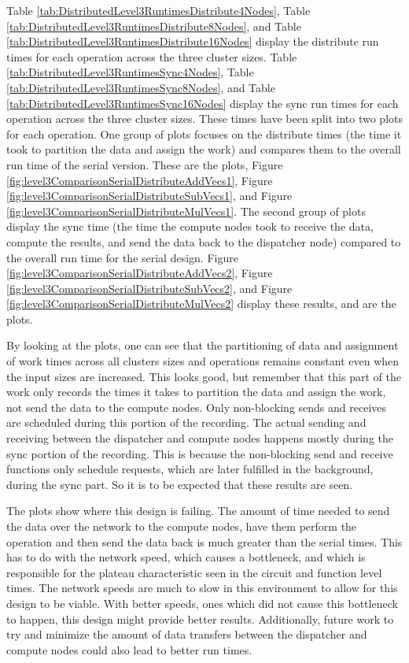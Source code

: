 Table \ref{tab:DistributedLevel3RuntimesDistribute4Nodes}, Table \ref{tab:DistributedLevel3RuntimesDistribute8Nodes}, and Table \ref{tab:DistributedLevel3RuntimesDistribute16Nodes} display the distribute run times for each operation across the three cluster sizes. Table \ref{tab:DistributedLevel3RuntimesSync4Nodes}, Table \ref{tab:DistributedLevel3RuntimesSync8Nodes}, and Table \ref{tab:DistributedLevel3RuntimesSync16Nodes} display the sync run times for each operation across the three cluster sizes. These times have been split into two plots for each operation. One group of plots focuses on the distribute times (the time it took to partition the data and assign the work) and compares them to the overall run time of the serial version. These are the  plots, Figure \ref{fig:level3ComparisonSerialDistributeAddVecs1}, Figure \ref{fig:level3ComparisonSerialDistributeSubVecs1}, and Figure \ref{fig:level3ComparisonSerialDistributeMulVecs1}. The second group of plots display the sync time (the time the compute nodes took to receive the data, compute the results, and send the data back to the dispatcher node) compared to the overall run time for the serial design. Figure \ref{fig:level3ComparisonSerialDistributeAddVecs2}, Figure \ref{fig:level3ComparisonSerialDistributeSubVecs2}, and Figure \ref{fig:level3ComparisonSerialDistributeMulVecs2} display these results, and are the  plots.

By looking at the  plots, one can see that the partitioning of data and assignment of work times across all clusters sizes and operations remains constant even when the input sizes are increased. This looks good, but remember that this part of the work only records the times it takes to partition the data and assign the work, not send the data to the compute nodes. Only non-blocking sends and receives are scheduled during this portion of the recording. The actual sending and receiving between the dispatcher and compute nodes happens mostly during the sync portion of the recording. This is because the non-blocking send and receive functions only schedule requests, which are later fulfilled in the background, during the sync part. So it is to be expected that these results are seen.

The  plots show where this design is failing. The amount of time needed to send the data over the network to the compute nodes, have them perform the operation and then send the data back is much greater than the serial times. This has to do with the network speed, which causes a bottleneck, and which is responsible for the plateau characteristic seen in the circuit and function level times. The network speeds are much to slow in this environment to allow for this design to be viable. With better speeds, ones which did not cause this bottleneck to happen, this design might provide better results. Additionally, future work to try and minimize the amount of data transfers between the dispatcher and compute nodes could also lead to better run times.

